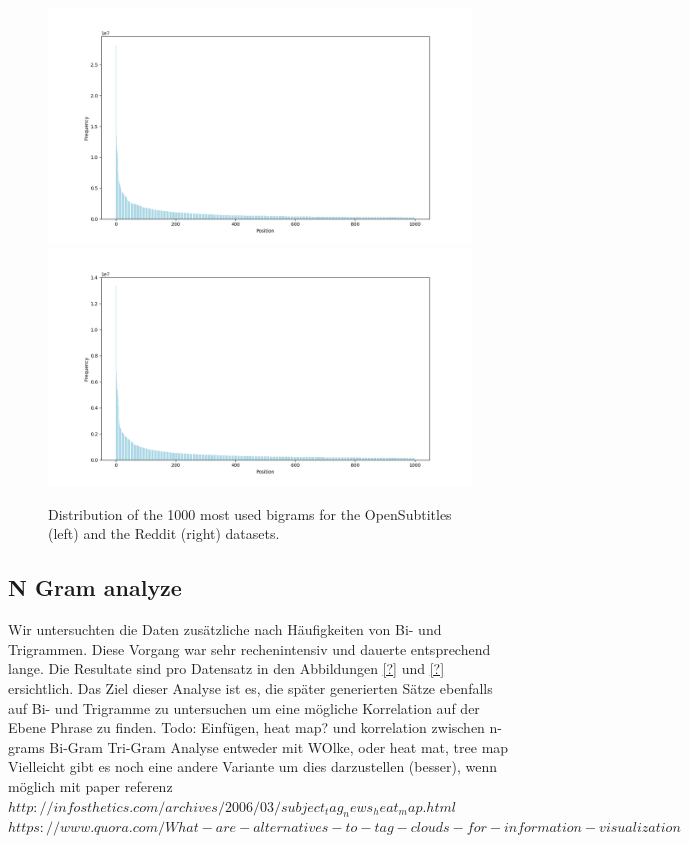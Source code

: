 \begin{figure}[htb]
	\includegraphics[width=\linewidth]{img/opensubtitles_bigram_top_1000_dist}
	\centering
	\small
	\endminipage\hfill
	\includegraphics[width=\linewidth]{img/reddit_bigram_top_1000_dist}
	\centering
	\small
	\endminipage\hfill
	\caption{Distribution of the 1000 most used bigrams for the OpenSubtitles (left) and the Reddit (right) datasets.}
	\label{data:ngram:freq_dist_top_1000}
\end{figure}

\subsection{N Gram analyze}
Wir untersuchten die Daten zusätzliche nach Häufigkeiten von Bi- und Trigrammen. Diese Vorgang war sehr rechenintensiv und dauerte entsprechend lange. Die Resultate sind pro Datensatz in den Abbildungen \ref{?} und \ref{?} ersichtlich. Das Ziel dieser Analyse ist es, die später generierten Sätze ebenfalls auf Bi- und Trigramme zu untersuchen um eine mögliche Korrelation auf der Ebene Phrase zu finden.
Todo: Einfügen, heat map? und korrelation zwischen n-grams
Bi-Gram Tri-Gram Analyse entweder mit WOlke, oder heat mat, tree map
Vielleicht gibt es noch eine andere Variante um dies darzustellen (besser), wenn möglich mit paper referenz
$http://infosthetics.com/archives/2006/03/subject_tag_news_heat_map.html$
$https://www.quora.com/What-are-alternatives-to-tag-clouds-for-information-visualization$
